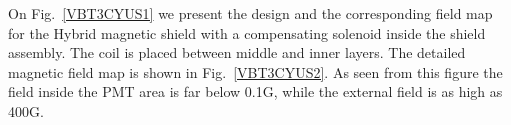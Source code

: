 \documentclass[12pt]{article}
\begin{document}
On Fig.~\ref{VBT3CYUS1} we present the  design and the corresponding field map  
for the Hybrid magnetic shield with a compensating solenoid inside the shield assembly. 
The coil is placed between  middle and  inner layers. The detailed magnetic field map  is 
shown in Fig.~\ref{VBT3CYUS2}.
As seen from this figure the field inside the PMT area is far below  0.1G,  
while the  external field is as high as 400G. 
% 
\end{document}
